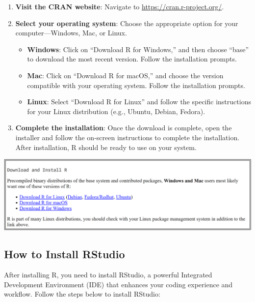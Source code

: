 \documentclass[
]{book}
\providecommand{\tightlist}{%
  \setlength{\itemsep}{0pt}\setlength{\parskip}{0pt}}
\begin{document}
\begin{enumerate}
\def\labelenumi{\arabic{enumi}.}
\tightlist
\item
  \textbf{Visit the CRAN website}: Navigate to \url{https://cran.r-project.org/}.
\item
  \textbf{Select your operating system}: Choose the appropriate option for your computer---Windows, Mac, or Linux.

  \begin{itemize}
  \tightlist
  \item
    \textbf{Windows}: Click on ``Download R for Windows,'' and then choose ``base'' to download the most recent version. Follow the installation prompts.
  \item
    \textbf{Mac}: Click on ``Download R for macOS,'' and choose the version compatible with your operating system. Follow the installation prompts.
  \item
    \textbf{Linux}: Select ``Download R for Linux'' and follow the specific instructions for your Linux distribution (e.g., Ubuntu, Debian, Fedora).
  \end{itemize}
\item
  \textbf{Complete the installation}: Once the download is complete, open the installer and follow the on-screen instructions to complete the installation. After installation, R should be ready to use on your system.
\end{enumerate}

\href{https://cran.r-project.org/}{\includegraphics[width=1\textwidth,height=\textheight]{images/install-r.png}}

\subsection*{How to Install RStudio}\label{how-to-install-rstudio}

After installing R, you need to install RStudio, a powerful Integrated Development Environment (IDE) that enhances your coding experience and workflow. Follow the steps below to install RStudio:
\end{document}
